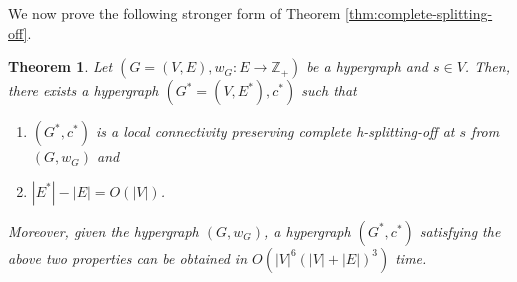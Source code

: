 \documentclass{article}
\newtheorem{theorem}{Theorem}[section]
\providecommand{\Z}{\mathbb{Z}}
\begin{document}
We now prove the following stronger form of Theorem \ref{thm:complete-splitting-off}.
\begin{theorem}\label{thm:hypergraphs-splitting-off-stronger-form}
    Let $(G=(V, E), w_G: E\rightarrow \Z_+)$ be a hypergraph and $s\in V$. Then, there exists a hypergraph $(G^*=(V, E^*), c^*)$ such that 
    \begin{enumerate}
        \item $(G^*, c^*)$ is a local connectivity preserving complete h-splitting-off at $s$ from $(G, w_G)$ and 
        \item $|E^*|-|E|=O(|V|)$. 
    \end{enumerate}
    Moreover, given the hypergraph $(G, w_G)$, a hypergraph $(G^*, c^*)$ satisfying the above two properties can be obtained in $O(|V|^6(|V|+|E|)^3)$ time. 
\end{theorem}
\end{document}
